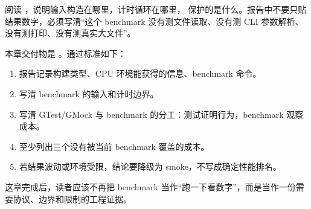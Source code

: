 阅读 ，说明输入构造在哪里，计时循环在哪里， 保护的是什么。报告中不要只贴结果数字，必须写清“这个 benchmark 没有测文件读取、没有测 CLI 参数解析、没有测打印、没有测真实大文件”。


本章交付物是 。通过标准如下：

\begin{enumerate}
  \item 报告记录构建类型、CPU 环境能获得的信息、benchmark 命令。
  \item 写清 benchmark 的输入和计时边界。
  \item 写清 GTest/GMock 与 benchmark 的分工：测试证明行为，benchmark 观察成本。
  \item 至少列出三个没有被当前 benchmark 覆盖的成本。
  \item 若结果波动或环境受限，结论要降级为 smoke，不写成确定性能排名。
\end{enumerate}

这章完成后，读者应该不再把 benchmark 当作“跑一下看数字”，而是当作一份需要协议、边界和限制的工程证据。
